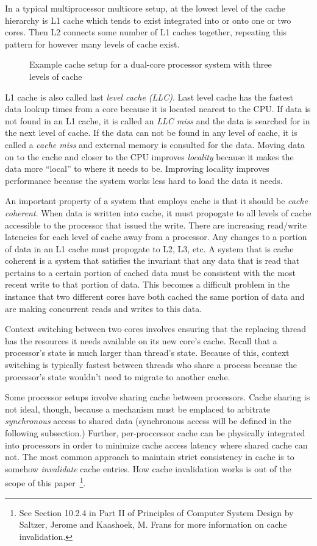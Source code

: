 \documentclass{sig-alternate}
\begin{document}
In a typical multiprocessor multicore setup, at the lowest level of the cache hierarchy is L1 cache which tends to exist integrated into or onto one or two cores. Then L2 connects some number of L1 caches together, repeating this pattern for however many levels of cache exist.


\begin{figure}
\centering
{}
\caption{Example cache setup for a dual-core processor system with three levels of cache}
\label{fig:cache}
\end{figure}


L1 cache is also called last \emph{level cache (LLC)}. Last level cache has the fastest data lookup times from a core because it is located nearest to the CPU. If data is not found in an L1 cache, it is called an \emph{LLC miss} and the data is searched for in the next level of cache. If the data can not be found in any level of cache, it is called a \emph{cache miss} and external memory is consulted for the data. Moving data on to the cache and closer to the CPU improves \emph{locality} because it makes the data more ``local'' to where it needs to be. Improving locality improves performance because the system works less hard to load the data it needs.

An important property of a system that employs cache is that it should be \emph{cache coherent}. When data is written into cache, it must propogate to all levels of cache accessible to the processor that issued the write. There are increasing read/write latencies for each level of cache away from a processor. Any changes to a portion of data in an L1 cache must propogate to L2, L3, etc. A system that is cache coherent is a system that satisfies the invariant that any data that is read that pertains to a certain portion of cached data must be consistent with the most recent write to that portion of data. This becomes a difficult problem in the instance that two different cores have both cached the same portion of data and are making concurrent reads and writes to this data.~\cite{Systems}

Context switching between two cores involves ensuring that the replacing thread has the resources it needs available on its new core's cache. Recall that a processor's state is much larger than thread's state. Because of this, context switching is typically fastest between threads who share a process because the processor's state wouldn't need to migrate to another cache.

Some processor setups involve sharing cache between processors. Cache sharing is not ideal, though, because a mechanism must be emplaced to arbitrate \emph{synchronous} access to shared data (synchronous access will be defined in the following subsection.) Further, per-proccessor cache can be physically integrated into processors in order to minimize cache access latency where shared cache can not. The most common approach to maintain strict consistency in cache is to somehow \emph{invalidate} cache entries. How cache invalidation works is out of the scope of this paper~\footnote{See Section 10.2.4 in Part II of Principles of Computer System Design by Saltzer, Jerome and Kaashoek, M. Frans for more information on cache invalidation.}.~\cite{Systems}
\end{document}
